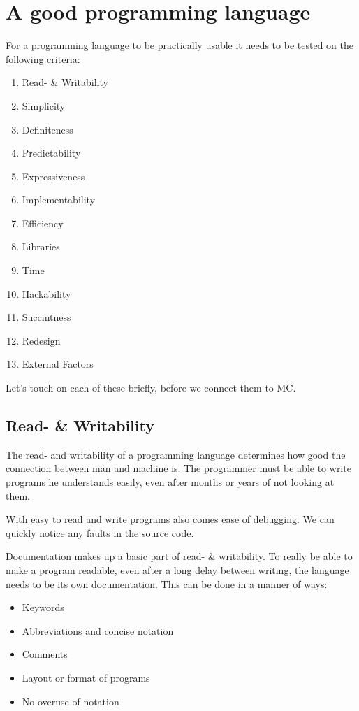 \chapter{A good programming language}\label{chap:criteria}

For a programming language to be practically usable it needs to be tested on the following criteria\cite{khedker1997makes,graham2004hackers}:

\begin{multicols}{2}
\begin{enumerate}[noitemsep]
   \item Read- \& Writability
   \item Simplicity
   \item Definiteness
   \item Predictability
   \item Expressiveness
   \item Implementability
   \item Efficiency
   \item Libraries
   \item Time
   \item Hackability
   \item Succintness
   \item Redesign
   \item External Factors
\end{enumerate}
\end{multicols}
Let's touch on each of these briefly, before we connect them to MC.

\section{Read- \& Writability }
The read- and writability of a programming language determines how good the connection between man and machine is.
The programmer must be able to write programs he understands easily, even after months or years of not looking at them.

With easy to read and write programs also comes ease of debugging.
We can quickly notice any faults in the source code.

Documentation makes up a basic part of read- \& writability.
To really be able to make a program readable, even after a long delay between writing, the language needs to be its own documentation.
This can be done in a manner of ways:
\begin{itemize}[noitemsep]
   \item Keywords
   \item Abbreviations and concise notation
   \item Comments
   \item Layout or format of programs
   \item No overuse of notation
\end{itemize}

